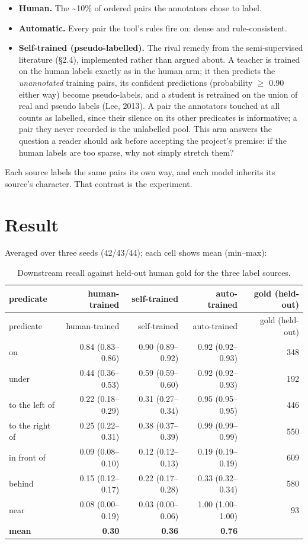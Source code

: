 \begin{itemize}
\item \textbf{Human.} The \textasciitilde{}10\% of ordered pairs the annotators chose to label.
\item \textbf{Automatic.} Every pair the tool's rules fire on: dense and
rule-consistent.
\item \textbf{Self-trained (pseudo-labelled).} The rival remedy from the
semi-supervised literature (\S2.4), implemented rather than argued about. A teacher is trained on the human labels exactly as in the human arm; it then predicts the \textit{unannotated} training pairs, its confident predictions (probability $\geq$ 0.90 either way) become pseudo-labels, and a student is retrained on the union of real and pseudo labels (Lee, 2013). A pair the annotators touched at all counts as labelled, since their silence on its other predicates is informative; a pair they never recorded is the unlabelled pool. This arm answers the question a reader should ask before accepting the project's premise: if the human labels are too sparse, why not simply stretch them?
\end{itemize}

Each source labels the same pairs its own way, and each model inherits its source's character. That contrast is the experiment.

\section{Result}

Averaged over three seeds (42/43/44); each cell shows mean (min--max):

\begin{center}
\small
\begin{longtable}{lrrrr}
\caption{Downstream recall against held-out human gold for the three label sources.}\\
\hline
predicate & human-trained & self-trained & auto-trained & gold (held-out) \\
\hline
\endfirsthead
\hline
predicate & human-trained & self-trained & auto-trained & gold (held-out) \\
\hline
\endhead
on & 0.84 (0.83--0.86) & 0.90 (0.89--0.92) & 0.92 (0.92--0.93) & 348 \\
under & 0.44 (0.36--0.53) & 0.59 (0.59--0.60) & 0.92 (0.92--0.93) & 192 \\
to the left of & 0.22 (0.18--0.29) & 0.31 (0.27--0.34) & 0.95 (0.95--0.95) & 446 \\
to the right of & 0.25 (0.22--0.31) & 0.38 (0.37--0.39) & 0.99 (0.99--0.99) & 550 \\
in front of & 0.09 (0.08--0.10) & 0.12 (0.12--0.13) & 0.19 (0.19--0.19) & 609 \\
behind & 0.15 (0.12--0.17) & 0.22 (0.17--0.28) & 0.33 (0.32--0.34) & 580 \\
near & 0.08 (0.00--0.19) & 0.03 (0.00--0.06) & 1.00 (1.00--1.00) & 93 \\
\textbf{mean} & \textbf{0.30} & \textbf{0.36} & \textbf{0.76} &  \\
\hline
\end{longtable}
\end{center}

